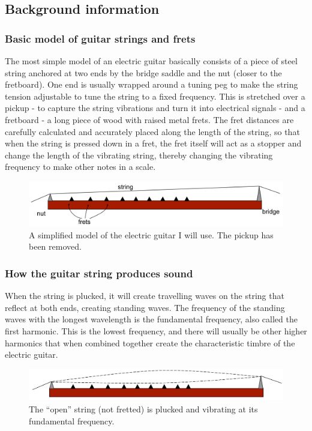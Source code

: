 \documentclass[11pt]{article}
\begin{document}
\begin{flushleft}
        \subsection{Background information}
            \subsubsection*{Basic model of guitar strings and frets}
                The most simple model of an electric guitar basically consists of a piece of steel string anchored at two ends by the bridge saddle and the nut (closer to the fretboard). One end is usually wrapped around a tuning peg to make the string tension adjustable to tune the string to a fixed frequency. This is stretched over a pickup - to capture the string vibrations and turn it into electrical signals - and a fretboard - a long piece of wood with raised metal frets. The fret distances are carefully calculated and accurately placed along the length of the string, so that when the string is pressed down in a fret, the fret itself will act as a stopper and change the length of the vibrating string, thereby changing the vibrating frequency to make other notes in a scale. 
                \begin{figure}[h]
                    \includegraphics[width=\textwidth]{fig1.png}
                    \caption{A simplified model of the electric guitar I will use. The pickup has been removed.}\label{fig1}
                \end{figure} 
            \subsubsection*{How the guitar string produces sound}
                When the string is plucked, it will create travelling waves on the string that reflect at both ends, creating standing waves. The frequency of the standing waves with the longest wavelength is the fundamental frequency, also called the first harmonic. This is the lowest frequency, and there will usually be other higher harmonics that when combined together create the characteristic timbre of the electric guitar. 
                \begin{figure}[h]
                    \includegraphics[width=\textwidth]{fig2.png}
                    \caption{The “open” string (not fretted) is plucked and vibrating at its fundamental frequency.}\label{fig2}
                \end{figure} 
            

\end{flushleft}
\end{document}
